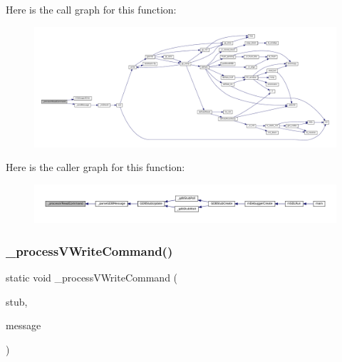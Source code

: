 Here is the call graph for this function\+:
\nopagebreak
\begin{figure}[H]
\begin{center}
\leavevmode
\includegraphics[width=350pt]{gdb-stub_8c_a28273f2230ac620b2972bd50b2e6e6a9_cgraph}
\end{center}
\end{figure}
Here is the caller graph for this function\+:
\nopagebreak
\begin{figure}[H]
\begin{center}
\leavevmode
\includegraphics[width=350pt]{gdb-stub_8c_a28273f2230ac620b2972bd50b2e6e6a9_icgraph}
\end{center}
\end{figure}
\mbox{\label{gdb-stub_8c_a582e9560a7cedd1a58761398f1761a0d}} 
\subsubsection{\texorpdfstring{\+\_\+process\+V\+Write\+Command()}{\_processVWriteCommand()}}
{\footnotesize\ttfamily static void \+\_\+process\+V\+Write\+Command (\begin{DoxyParamCaption}\item[{struct G\+D\+B\+Stub $\ast$}]{stub,  }\item[{const char $\ast$}]{message }\end{DoxyParamCaption})\hspace{0.3cm}{\ttfamily [static]}}

